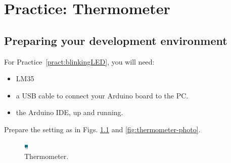 \chapter{Practice: Thermometer}\label{pract:thermometer}


\section{Preparing your development environment}
For Practice~\ref{pract:blinkingLED}, you will need:
\begin{itemize}
 \item LM35
 \item a USB cable to connect your Arduino board to the PC.
 \item the Arduino IDE, up and running.
\end{itemize}

Prepare the setting as in Figs. \ref{fig:thermometer-fritzing} and \ref{fig:thermometer-photo}.


\begin{figure}[htbp]
  \centering
  \includegraphics[width=0.7\linewidth]{figures/thermometer-fritzing.eps}
  \caption{Thermometer.}
  \label{fig:thermometer-fritzing}
\end{figure}

